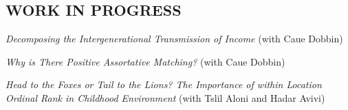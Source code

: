 \documentclass[margin]{res} %
\newcommand{\rootFolder}{/Users/tomzohar/Dropbox/}
\begin{document}
\begin{resume}

\subsection{WORK IN PROGRESS}

\textit{Decomposing the Intergenerational Transmission of Income} (with Caue Dobbin) 

%

%

\textit{Why is There Positive Assortative Matching?} (with Caue Dobbin) 

\textit{Head to the Foxes or Tail to the Lions? The Importance of within Location Ordinal Rank in Childhood Environment} (with Tslil Aloni and Hadar Avivi)






\end{resume}
\end{document}

